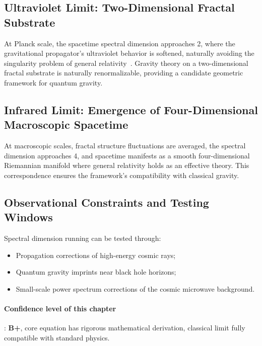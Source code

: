 \documentclass[12pt,a4paper,twocolumn]{article}
\begin{document}
\subsection{Ultraviolet Limit: Two-Dimensional Fractal Substrate}
At Planck scale, the spacetime spectral dimension approaches 2, where the gravitational propagator's ultraviolet behavior is softened, naturally avoiding the singularity problem of general relativity~\cite{tHooft1993}. Gravity theory on a two-dimensional fractal substrate is naturally renormalizable, providing a candidate geometric framework for quantum gravity.

\subsection{Infrared Limit: Emergence of Four-Dimensional Macroscopic Spacetime}
At macroscopic scales, fractal structure fluctuations are averaged, the spectral dimension approaches 4, and spacetime manifests as a smooth four-dimensional Riemannian manifold where general relativity holds as an effective theory. This correspondence ensures the framework's compatibility with classical gravity.

\subsection{Observational Constraints and Testing Windows}
Spectral dimension running can be tested through:
\begin{itemize}
\item Propagation corrections of high-energy cosmic rays;
\item Quantum gravity imprints near black hole horizons;
\item Small-scale power spectrum corrections of the cosmic microwave background.
\end{itemize}

\paragraph{Confidence level of this chapter}: \textbf{B+}, core equation has rigorous mathematical derivation, classical limit fully compatible with standard physics.
\end{document}
